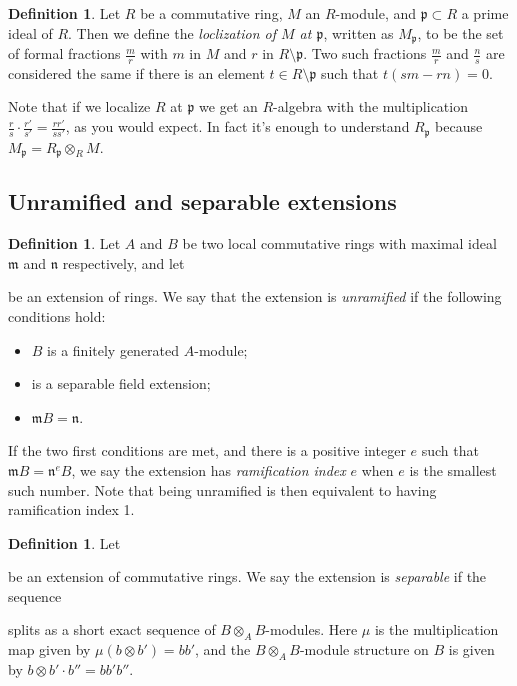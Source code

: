 \documentclass[11pt, a4paper, english]{article}
\theoremstyle{definition}
\newtheorem{defin}[theorem]{Definition}
\DeclareMathOperator{\Ker}{Ker}
\begin{document}
\begin{defin}
\label{def:localization}
Let $R$ be a commutative ring, $M$ an $R$-module, and $\mathfrak{p} \subset R$ a prime ideal of $R$. Then we define the \textit{loclization of $M$ at $\mathfrak{p}$}, written as $M_\mathfrak{p}$, to be the set of formal fractions $\frac{m}{r}$ with $m$ in $M$ and $r$ in $R \setminus \mathfrak{p}$. Two such fractions $\frac{m}{r}$ and $\frac{n}{s}$ are considered the same if there is an element $t \in R \setminus \mathfrak{p}$ such that $t(sm - rn) = 0$.

Note that if we localize $R$ at $\mathfrak{p}$ we get an $R$-algebra with the multiplication $\frac{r}{s} \cdot \frac{r'}{s'} = \frac{rr'}{ss'}$, as you would expect. In fact it's enough to understand $R_\mathfrak{p}$ because $M_\mathfrak{p} = R_\mathfrak{p} \otimes_R M$.
\end{defin}

\subsection{Unramified and separable extensions}

\begin{defin}
Let $A$ and $B$ be two local commutative rings with maximal ideal $\mathfrak{m}$ and $\mathfrak{n}$ respectively, and let
be an extension of rings. We say that the extension is \textit{unramified} if the following conditions hold:
\begin{itemize}
\item $B$ is a finitely generated $A$-module;
\item {}
is a separable field extension;
\item $\mathfrak{m}B = \mathfrak{n}$.
\end{itemize}
If the two first conditions are met, and there is a positive integer $e$ such that $\mathfrak{m} B = \mathfrak{n}^e B$, we say the extension has \textit{ramification index} $e$ when $e$ is the smallest such number. Note that being unramified is then equivalent to having ramification index 1.
\end{defin}

\begin{defin}
Let  be an extension of commutative rings. We say the extension is \textit{separable} if the sequence
\begin{center}
\end{center}
splits as a short exact sequence of $B\otimes_AB$-modules. Here $\mu$ is the multiplication map given by $\mu(b \otimes b') = bb'$, and the $B \otimes_A B$-module structure on $B$ is given by $b \otimes b' \cdot b'' = bb'b''$.
\end{defin}
\end{document}
